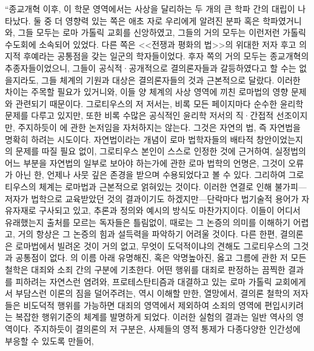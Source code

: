``종교개혁 이후,
이 학문 영역에서는
사상을 달리하는 두 개의 큰 학파 간의 대립이 나타났다.
둘 중 더 영향력 있는 쪽은 애초
자로 우리에게 알려진 분파 혹은 학파였거니와,
그들 모두는 로마 가톨릭 교회를 신앙하였고,
그들의 거의 모두는 이런저런 가톨릭 수도회에 소속되어 있었다.
다른 쪽은
<<전쟁과 평화의 법>>의 위대한 저자
후고 의 지적 후예라는 공통점을 갖는
일군의 학자들이었다.
후자 쪽의 거의 모두는 종교개혁의 추종자들이었으니,
그들이 공식적^^b7공개적으로 결의론자들과 갈등하였다고 할 수는 없을지라도,
그들 체계의 기원과 대상은 결의론자들의 것과 근본적으로 달랐다.
이러한 차이는 주목할 필요가 있거니와,
이들 양 체계의 사상 영역에 끼친 로마법의 영향 문제와 관련되기 때문이다.
그로티우스의 저 저서는,
비록 모든 페이지마다 순수한 윤리학 문제를 다루고 있지만,
또한 비록 수많은 공식적인 윤리학 저서의 직^^b7간접적 선조이지만,
주지하듯이 에 관한 논저임을 자처하지는 않는다.
그것은 자연의 법,
즉 자연법을 명확히 하려는 시도이다.
자연법이라는 개념이 로마 법학자들의 배타적 창안이었는지의
문제를 따질 필요 없이,
그로티우스 본인이 스스로 인정한 것에 근거하여,
실정법의 어느 부분을 자연법의 일부로 보아야 하는가에 관한
로마 법학의 언명은,
그것이 오류가 아닌 한,
언제나
사뭇 깊은 존경을 받으며 수용되었다고
볼 수 있다.
그리하여 그로티우스의 체계는
로마법과 근본적으로 얽혀있는 것이다.
이러한 연결로 인해 불가피---저자가 법학으로 교육받았던 것의
결과이기도 하겠지만---단락마다
법기술적 용어가 자유자재로 구사되고 있고,
추론과
정의와 예시의 방식도 마찬가지이다.
이들이 어디서 유래했는지 출처를 모르는 독자들은 틀림없이,
때로는 그 논증의 의미를 이해하기 어렵고,
거의 항상은 그 논증의 힘과 설득력을 파악하기 어려울 것이다.
다른 한편,
결의론은 로마법에서 빌려온 것이 거의 없고,
무엇이 도덕적이냐의 견해도 그로티우스의 그것과 공통점이 없다.
의 이름 아래 유명해진, 혹은 악명높아진, 옳고 그름에 관한 저 모든 철학은
대죄와
소죄 간의 구분에 기초한다.
어떤 행위를 대죄로 판정하는 끔찍한 결과를 피하려는 자연스런 염려와,
프로테스탄티즘과 대결하고 있는 로마 가톨릭 교회에게서
부담스런 이론의 짐을 덜어주려는, 역시 이해할 만한, 열망에서,
결의론 철학의 저자들은
비도덕적 행위를 가능하면 대죄의 영역에서 제외하여
소죄의 영역에 편입시키려는 복잡한 행위기준의 체계를 발명하게 되었다.
이러한 실험의 결과는 일반 역사의 영역이다.
주지하듯이 결의론의 저 구분은,
사제들의 영적 통제가 다종다양한 인간성에 부응할 수 있도록 만들어,
